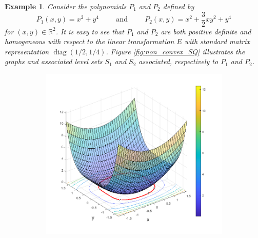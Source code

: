 \documentclass[11pt]{article}
\newtheorem{example}{Example}
\theoremstyle{remark}
\newcommand\diag{\operatorname{diag}}
\newcommand{\f}[2]{\frac{#1}{#2}}
\begin{document}
\begin{example}\label{exp:non_convex}\normalfont
Consider the polynomials $P_1$ and $P_2$ defined by
\begin{equation*}
P_1(x,y)=x^2+y^4\hspace{1cm}\mbox{and}\hspace{1cm}P_2(x,y)=x^2 + \f{3}{2} xy^2 + y^4
\end{equation*}
for $(x,y)\in\mathbb{R}^2$. It is easy to see that $P_1$ and $P_2$ are both positive definite and homogeneous with respect to the linear transformation $E$ with standard matrix representation $\diag(1/2,1/4)$. Figure \ref{fig:non_convex_SQ} illustrates the graphs and associated level sets $S_{1}$ and $S_{2}$ associated, respectively to $P_1$ and $P_2$. 

\begin{figure}[!htb]
    \centering
    \hspace{10pt}
    \begin{subfigure}{0.5\textwidth}
    \centering
    \includegraphics[scale=0.45]{non_convex_SP.png}
    \vspace{-10pt}

\end{subfigure}
\end{figure}
\end{example}
\end{document}
